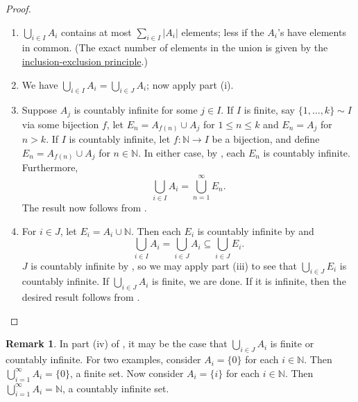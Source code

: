 \documentclass[12pt]{article}
\theoremstyle{definition}
\newtheorem*{remark}{Remark}
\begin{document}
\begin{proof}
    \begin{enumerate}[label = (\roman*)]
        \item \( \bigcup_{i \in I} A_i \) contains at most \( \sum_{i \in I} |A_i| \) elements; less if the \( A_i \)'s have elements in common. (The exact number of elements in the union is given by the \href{https://en.wikipedia.org/wiki/Inclusion%E2%80%93exclusion_principle}{inclusion-exclusion principle}.)

        \item We have \( \bigcup_{i \in I} A_i = \bigcup_{i \in J} A_i \); now apply part (i).

        \item Suppose \( A_j \) is countably infinite for some \( j \in I \). If \( I \) is finite, say \( \{ 1, \ldots, k \} \sim I \) via some bijection \( f \), let \( E_n = A_{f(n)} \cup A_j \) for \( 1 \leq n \leq k \) and \( E_n = A_j \) for \( n > k \). If \( I \) is countably infinite, let \( f : \mathbb{N} \to I \) be a bijection, and define \( E_n = A_{f(n)} \cup A_j \) for \( n \in \mathbb{N} \). In either case, by , each \( E_n \) is countably infinite. Furthermore,
        \[
            \bigcup_{i \in I} A_i = \bigcup_{n=1}^{\infty} E_n.
        \]
        The result now follows from .

        \item For \( i \in J \), let \( E_i = A_i \cup \mathbb{N} \). Then each \( E_i \) is countably infinite by  and
        \[
            \bigcup_{i \in I} A_i = \bigcup_{i \in J} A_i \subseteq \bigcup_{i \in J} E_i.
        \]
        \( J \) is countably infinite by , so we may apply part (iii) to see that \( \bigcup_{i \in J} E_i \) is countably infinite. If \( \bigcup_{i \in J} A_i \) is finite, we are done. If it is infinite, then the desired result follows from . \qedhere
    \end{enumerate}
\end{proof}

\begin{remark}
    In part (iv) of , it may be the case that \( \bigcup_{i \in J} A_i \) is finite or countably infinite. For two examples, consider \( A_i = \{ 0 \} \) for each \( i \in \mathbb{N} \). Then \( \bigcup_{i=1}^{\infty} A_i = \{ 0 \} \), a finite set. Now consider \( A_i = \{ i \} \) for each \( i \in \mathbb{N} \). Then \( \bigcup_{i=1}^{\infty} A_i = \mathbb{N} \), a countably infinite set.
\end{remark}
\end{document}
